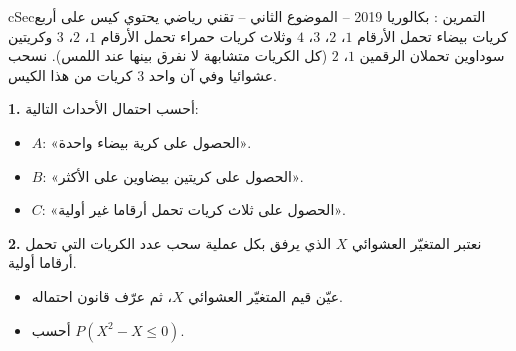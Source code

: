 \documentclass[12pt,a4paper]{article}
\newenvironment{BOX}[2]{\begin{otherlanguage}{english}\begin{arbox}{#1}{#2}}{\end{arbox}\end{otherlanguage}}
\newcounter{exo}
\newenvironment{tamrin}[1]{\stepcounter{exo}\begin{BOX}{cSec}{التمرين \theexo: #1}}{\end{BOX}}
\newenvironment{sq}{\begin{itemize}[leftmargin=2.4em,itemsep=3pt]}{\end{itemize}}
\newcommand{\qa}{\item[(أ)]}\newcommand{\qb}{\item[(ب)]}\newcommand{\qc}{\item[(جـ)]}\newcommand{\qd}{\item[(د)]}\newcommand{\qe}{\item[(هـ)]}
\newcommand{\QQ}[1]{\par\smallskip\textbf{#1.} }
\begin{document}
\begin{tamrin}{بكالوريا 2019 -- الموضوع الثاني -- تقني رياضي}
يحتوي كيس على أربع كريات بيضاء تحمل الأرقام $1$، $2$، $3$، $4$ وثلاث كريات حمراء تحمل الأرقام $1$، $2$، $3$ وكريتين سوداوين تحملان الرقمين $1$، $2$ (كل الكريات متشابهة لا نفرق بينها عند اللمس). نسحب عشوائيا وفي آن واحد $3$ كريات من هذا الكيس.
\QQ{1} أحسب احتمال الأحداث التالية:
\begin{itemize}
\item $A$: «الحصول على كرية بيضاء واحدة».
\item $B$: «الحصول على كريتين بيضاوين على الأكثر».
\item $C$: «الحصول على ثلاث كريات تحمل أرقاما غير أولية».
\end{itemize}
\QQ{2} نعتبر المتغيّر العشوائي $X$ الذي يرفق بكل عملية سحب عدد الكريات التي تحمل أرقاما أولية.
\begin{sq}
\qa عيّن قيم المتغيّر العشوائي $X$، ثم عرّف قانون احتماله.
\qb أحسب $P(X^2-X\le0)$.
\end{sq}
\end{tamrin}
\end{document}
